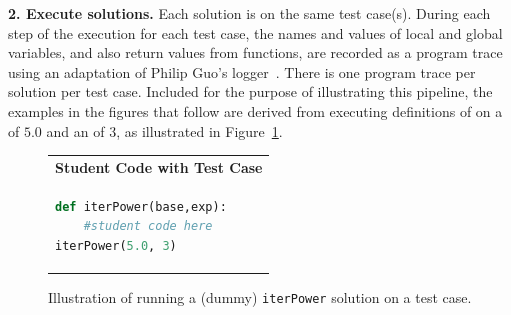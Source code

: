 {\bf 2. Execute solutions.} Each solution is on the same test case(s). During each step of the execution for each test case, the names and values of local and global variables, and also return values from functions, are recorded as a program trace using an adaptation of Philip Guo's logger~\cite{pgbovineOPT}. There is one program trace per solution per test case. Included for the purpose of illustrating this pipeline, the examples in the figures that follow are derived from executing definitions of  on a  of $5.0$ and an  of $3$, as illustrated in Figure~\ref{fig:testcase}.
\begin{figure}
\begin{tabular}{l}
{\bf Student Code with Test Case} \\
\begin{minipage}{0.5\linewidth}
\begin{lstlisting}[basicstyle=\linespread{1.0}\ttfamily\footnotesize,language=python]
def iterPower(base,exp):
    #student code here
iterPower(5.0, 3)
\end{lstlisting}
\end{minipage} 
\end{tabular}
\caption{Illustration of running a (dummy) \texttt{iterPower} solution on a test case.}
\label{fig:testcase}
\end{figure}

